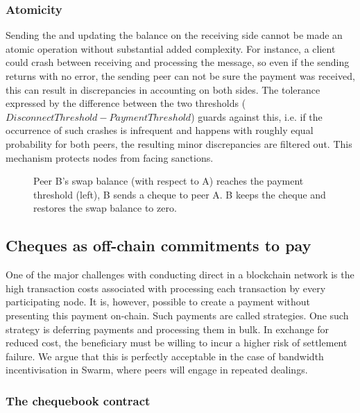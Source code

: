 \subsubsection{Atomicity}

Sending the  and updating the balance on the receiving side cannot be made an atomic operation without substantial added complexity. For instance, a client could crash between receiving and processing the message, so even if the sending returns with no error, the sending peer can not be sure the payment was received, this can result in discrepancies in accounting on both sides. The tolerance expressed by the difference between the two thresholds ($\mathit{DisconnectThreshold}-\mathit{PaymentThreshold}$) guards against this, i.e. if the occurrence of such crashes is infrequent and happens with roughly equal probability for both peers, the resulting minor discrepancies are filtered out. This mechanism protects nodes from facing sanctions.

\begin{center}
\begin{figure}[htbp]

\caption[Cheque swap \statusgreen]{Peer B's swap balance (with respect to A) reaches the payment threshold (left),
B sends a cheque to peer A. B keeps the cheque and restores the swap balance to zero.}
\label{fig:chequeswap}
\end{figure}
\end{center}

\subsection{Cheques as off-chain commitments to pay\statusgreen}\label{sec:cheques}

One of the major challenges with conducting direct  in a blockchain network is the high transaction costs associated with processing each transaction by every participating node. It is, however, possible to create a payment without presenting this payment on-chain. Such payments are called  strategies. One such strategy is deferring payments and processing them in bulk. In exchange for reduced cost, the beneficiary must be willing to incur a higher risk of settlement failure. We argue that this is perfectly acceptable in the case of bandwidth incentivisation in Swarm, where peers will engage in repeated dealings.


\subsubsection{The chequebook contract}

